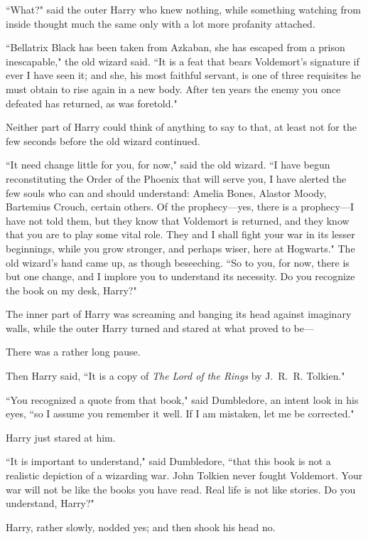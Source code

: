 ``What?" said the outer Harry who knew nothing, while something watching from inside thought much the same only with a lot more profanity attached.

``Bellatrix Black has been taken from Azkaban, she has escaped from a prison inescapable," the old wizard said. ``It is a feat that bears Voldemort's signature if ever I have seen it; and she, his most faithful servant, is one of three requisites he must obtain to rise again in a new body. After ten years the enemy you once defeated has returned, as was foretold."

Neither part of Harry could think of anything to say to that, at least not for the few seconds before the old wizard continued.

``It need change little for you, for now," said the old wizard. ``I have begun reconstituting the Order of the Phoenix that will serve you, I have alerted the few souls who can and should understand: Amelia Bones, Alastor Moody, Bartemius Crouch, certain others. Of the prophecy---yes, there is a prophecy---I have not told them, but they know that Voldemort is returned, and they know that you are to play some vital role. They and I shall fight your war in its lesser beginnings, while you grow stronger, and perhaps wiser, here at Hogwarts." The old wizard's hand came up, as though beseeching. ``So to you, for now, there is but one change, and I implore you to understand its necessity. Do you recognize the book on my desk, Harry?"

The inner part of Harry was screaming and banging its head against imaginary walls, while the outer Harry turned and stared at what proved to be---

There was a rather long pause.

Then Harry said, ``It is a copy of \emph{The Lord of the Rings} by J.~R.~R. Tolkien."

``You recognized a quote from that book," said Dumbledore, an intent look in his eyes, ``so I assume you remember it well. If I am mistaken, let me be corrected."

Harry just stared at him.

``It is important to understand," said Dumbledore, ``that this book is not a realistic depiction of a wizarding war. John Tolkien never fought Voldemort. Your war will not be like the books you have read. Real life is not like stories. Do you understand, Harry?"

Harry, rather slowly, nodded yes; and then shook his head no.

